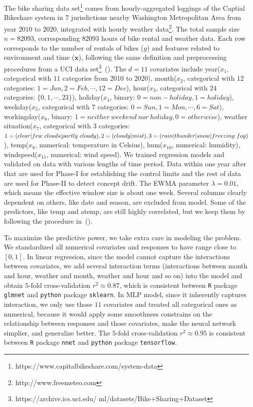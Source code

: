 \documentclass[twoside,11pt]{article}
\begin{document}
The bike sharing data set\footnote{https://www.capitalbikeshare.com/system-data} comes from hourly-aggregated loggings of the Captial Bikeshare system in $7$ jurisdictions nearby Washington Metropolitan Area from year $2010$ to $2020$, integrated with hourly weather data\footnote{http://www.freemeteo.com}. The total sample size $n=82093$, corresponding $82093$ hours of bike rental and weather data. Each row corresponds to the number of rentals of bikes ($y$) and features related to environment and time ($\bm {x}$), following the same definition and preprocessing procedures from a UCI data set\footnote{https://archive.ics.uci.edu/
ml/datasets/Bike+Sharing+Dataset}~(\cite{fanaee2014event}). The $d=11$ covariates include year($x_1$, categorical with $11$ categories from 2010 to 2020), month($x_2$, categorical with $12$ categories: $1=Jan, 2=Feb, \cdots, 12=Dec$), hour($x_3$, categorical with $24$ categories: $\{0,1,\cdots,23\}$), holiday($x_4$, binary: $0=non-holiday,1=holiday$), weekday($x_5$, categorical with $7$ categories: 
$0=Sun,1=Mon,\cdots,6=Sat$), workingday($x_6$, binary: $1=neither~weekend~nor~holiday,0=otherwise$), weather situation($x_7$, categorical with $3$ categories: $1=(clear|few~clouds\\|partly~cloudy),2=(cloudy|mist),3=(rain|thunder|snow|freezing~fog)$), temp($x_8$, numerical: temperature in Celsius), hum($x_{10}$, numerical: humidity), windspeed($x_{11}$, numerical: wind speed). We trained regression models and validated on data with various lengths of time period. Data within one year after that are used for Phase-I for establishing the control limits and the rest of data are used for Phase-II to detect concept drift. The EWMA parameter $ \lambda = 0.01$, which means the effective window size is about one week. Several columns clearly dependent on others, like date and season, are excluded from model. Some of the predictors, like temp and atemp, are still highly correlated, but we keep them by following the procedure in~(\cite{apley2016visualizing}). 

To maximize the predictive power, we take extra care in modeling the problem. We standardized all numerical covariates and responses to have range close to $[0,1]$. In linear regression, since the model cannot capture the interactions between covariates, we add several interaction terms (interactions between month and hour, weather and month, weather and hour and so on) into the model and obtain $5$-fold cross-validation $r^2\approx 0.87$, which is consistent between \texttt{R} package \texttt{glmnet} and \texttt{python} package \texttt{sklearn}. In MLP model, since it inherently captures interaction, we only use those $11$ covariates and treated all categorical ones as numerical, because it would apply some smoothness constrains on the relationship between responses and those covariates, make the neural network simplier, and generalize better. The $5$-fold cross-validation $r^2\approx 0.95$ is consistent between \texttt{R} package \texttt{nnet} and \texttt{python} package \texttt{tensorflow}.
\end{document}
